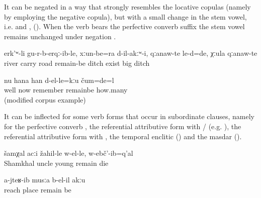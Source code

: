 It can be negated in a way that strongly resembles the locative copulas (namely by employing the negative copula), but with a small change in the stem vowel, i.e.  and  , (). When the verb  bears the perfective converb suffix  the stem vowel remains unchanged under negation .
%
\begin{exe}
	\ex	\label{ex:The river carried them away, roads had not remained, and big ditches were there}
	\gll	erk'ʷ-li	gu-r-b-erqː-ib-le,	xːun-be=ra	d-il-akːʷ-i,	qːanaw-te	le-d=de,		χːula	qːanaw-te\\
		river	carry	road	remain-be		ditch	exist		big	ditch\\
	\glt	{}

	\ex	\label{ex:Now I don't remember how many (rubles) it was. (modified example)}
	\gll	nu	hana	han	d-el-le=kːu	čum=de=l\\
		well	now	remember	remainbe	how.many\\
	\glt	{} (modified corpus example)
\end{exe}

It can be inflected for some verb forms that occur in subordinate clauses, namely for the perfective converb , the referential attributive form with \slash{} (e.g. ), the referential attributive form with  , the temporal enclitic  () and the masdar ().
%
\begin{exe}
	\ex	\label{ex:Uncle Shamkhal died when he was young}
	\gll	šamχal	acːi	žahil-le	w-el-le,	w-ebč'-ib=q'al\\
		Shamkhal	uncle	young	remain	die\\
	\glt	{}

	\ex	\label{ex:No place is left where I (masc.) did not go}
	\gll	a-jteʁ-ib	musːa	b-el-il	akːu\\
		reach	place	remain	be\\
	\glt	{}
\end{exe}

